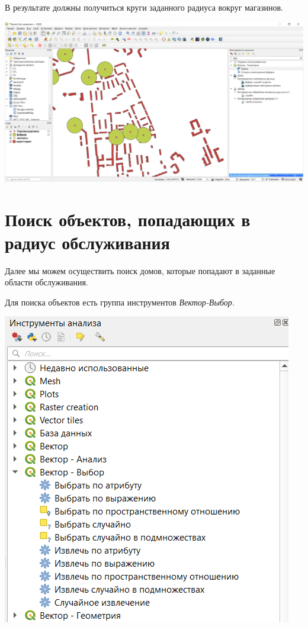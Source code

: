 \documentclass[
]{book}
\begin{document}
В результате должны получиться круги заданного радиуса вокруг магазинов.

\includegraphics{figures/47.png}

\hypertarget{ux43fux43eux438ux441ux43a-ux43eux431ux44aux435ux43aux442ux43eux432-ux43fux43eux43fux430ux434ux430ux44eux449ux438ux445-ux432-ux440ux430ux434ux438ux443ux441-ux43eux431ux441ux43bux443ux436ux438ux432ux430ux43dux438ux44f}{%
\section{Поиск объектов, попадающих в радиус обслуживания}\label{ux43fux43eux438ux441ux43a-ux43eux431ux44aux435ux43aux442ux43eux432-ux43fux43eux43fux430ux434ux430ux44eux449ux438ux445-ux432-ux440ux430ux434ux438ux443ux441-ux43eux431ux441ux43bux443ux436ux438ux432ux430ux43dux438ux44f}}

Далее мы можем осуществить поиск домов, которые попадают в заданные области обслуживания.

Для поиска объектов есть группа инструментов \emph{Вектор-Выбор}.

\includegraphics{figures/48.png}
\end{document}
